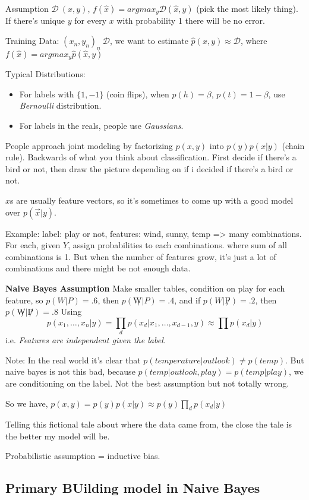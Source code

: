 Assumption $\mathcal{D}~(x,y)$, $f(\hat x) = argmax_y \mathcal{D}(\hat
x, y)$ (pick the most likely thing). If there's unique $y$ for every
$x$ with probability 1 there will be no error.

Training Data: $(x_n, y_n)_n ~ \mathcal{D}$, we want to estimate $\hat
p(x,y)\approx \mathcal{D}$, where $f(\hat x) = argmax_y \hat p(\hat x,
y)$

Typical Distributions:
\begin{itemize}
\item For labels with $\{1, -1\}$ (coin flips), when $p(h)=\beta$,
  $p(t) =1-\beta$, use \emph{Bernoulli} distribution.
\item For labels in the reals, people use \emph{Gaussians}.
\end{itemize}

People approach joint modeling by factorizing $p(x,y)$ into
$p(y)p(x|y)$ (chain rule). Backwards of what you think about
classification. First decide if there's a bird or not, then draw the
picture depending on if i decided if there's a bird or not.

$x$s are usually feature vectors, so it's sometimes to come up with a
good model over $p(\vec x| y)$.

Example: label: play or not, features: wind, sunny, temp => many
combinations. For each, given $Y$, assign probabilities to each
combinations. where sum of all combinations is 1. But when the number
of features grow, it's just a lot of combinations and there might be
not enough data.

\textbf{Naive Bayes Assumption}
Make smaller tables, condition on play for each feature, so
$p(W|P)=.6$, then $p(\not W|P)=.4$, and if $p(W|\not P)=.2$, then
$p(\not W|\not P)=.8$
Using $$p(x_1, \dots, x_n|y)=\prod_d p(x_d|x_1, \dots, x_{d-1}, y)
\approx \prod p(x_d|y)$$
i.e. \emph{Features are independent given the label.}

Note: In the real world it's clear that $p(temperature | outlook)\neq p(temp)$. But naive
bayes is not this bad, because $p(temp|outlook, play) = p(temp|play)$,
we are conditioning on the label. Not the best assumption but not
totally wrong.

So we have, $p(x,y) = p(y)p(x|y)\approx p(y)\prod_d p(x_d|y)$

Telling this fictional tale about where the data came from, the close
the tale is the better my model will be.

Probabilistic assumption = inductive bias.

\subsection{Primary BUilding model in Naive Bayes}

